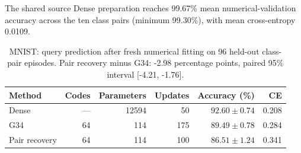 The shared source Dense preparation reaches 99.67\% mean numerical-validation accuracy across the ten class pairs (minimum 99.30\%), with mean cross-entropy 0.0109.

\begin{table}[htbp]
\centering\small
\begin{tabular}{lrrrrr}
\toprule
Method & Codes & Parameters & Updates & Accuracy (\%) & CE\\
\midrule
Dense & --- & 12594 & 50 & $92.60\pm0.74$ & 0.208\\
G34 & 64 & 114 & 175 & $89.49\pm0.78$ & 0.284\\
Pair recovery & 64 & 114 & 100 & $86.51\pm1.24$ & 0.341\\
\bottomrule\end{tabular}
\caption{MNIST: query prediction after fresh numerical fitting on 96 held-out class-pair episodes. Pair recovery minus G34: -2.98 percentage points, paired 95\% interval [-4.21, -1.76].}
\label{tab:recovery-mnist}
\end{table}
